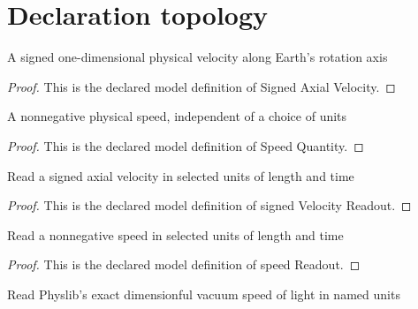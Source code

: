 \section{Declaration topology}
\begin{definition}
  \label{def:physics:phyx-mini-0591:phyxminiproblems-problemphyxmini0591-signedaxialvelocity}
  A signed one-dimensional physical velocity along Earth's rotation axis
\end{definition}
\begin{proof}
  This is the declared model definition of Signed Axial Velocity.
\end{proof}
\begin{definition}
  \label{def:physics:phyx-mini-0591:phyxminiproblems-problemphyxmini0591-speedquantity}
  A nonnegative physical speed, independent of a choice of units
\end{definition}
\begin{proof}
  This is the declared model definition of Speed Quantity.
\end{proof}
\begin{definition}
  \label{def:physics:phyx-mini-0591:phyxminiproblems-problemphyxmini0591-signedvelocityreadout}
  Read a signed axial velocity in selected units of length and time
\end{definition}
\begin{proof}
  This is the declared model definition of signed Velocity Readout.
\end{proof}
\begin{definition}
  \label{def:physics:phyx-mini-0591:phyxminiproblems-problemphyxmini0591-speedreadout}
  Read a nonnegative speed in selected units of length and time
\end{definition}
\begin{proof}
  This is the declared model definition of speed Readout.
\end{proof}
\begin{definition}
  \label{def:physics:phyx-mini-0591:phyxminiproblems-problemphyxmini0591-vacuumspeedoflightreadout}
  Read Physlib's exact dimensionful vacuum speed of light in named units
\end{definition}
